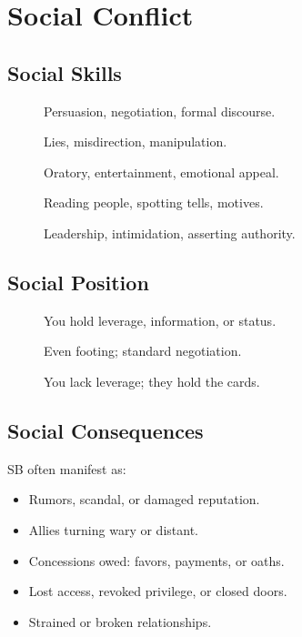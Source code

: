\section{Social Conflict}
\label{sec:social-conflict}

\subsection{Social Skills}
\label{subsec:social-skills}

\begin{description}
  \item[] Persuasion, negotiation, formal discourse. 
  \item[] Lies, misdirection, manipulation. 
  \item[] Oratory, entertainment, emotional appeal. 
  \item[] Reading people, spotting tells, motives. 
  \item[] Leadership, intimidation, asserting authority. 
\end{description}

\subsection{Social Position}
\label{subsec:social-position}

\begin{description}
  \item[] You hold leverage, information, or status. 
  \item[] Even footing; standard negotiation. 
  \item[] You lack leverage; they hold the cards. 
\end{description}

\subsection{Social Consequences}
\label{subsec:social-consequences}

SB often manifest as:
\begin{itemize}
  \item Rumors, scandal, or damaged reputation. 
  \item Allies turning wary or distant. 
  \item Concessions owed: favors, payments, or oaths. 
  \item Lost access, revoked privilege, or closed doors. 
  \item Strained or broken relationships. 
\end{itemize}

